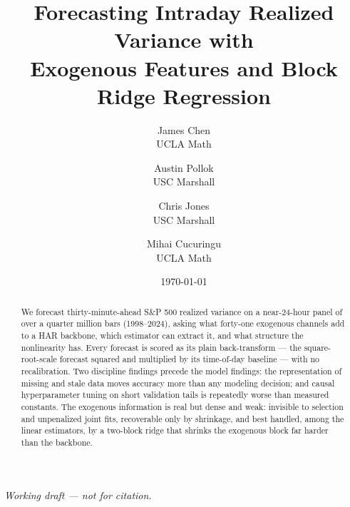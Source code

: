 \documentclass[12pt]{article}
\title{Forecasting Intraday Realized Variance with\\Exogenous Features and Block Ridge Regression}
\author{
James Chen\\{\small UCLA Math}
\and
Austin Pollok\\{\small USC Marshall}
\and
Chris Jones\\{\small USC Marshall}
\and
Mihai Cucuringu\\{\small UCLA Math}
}
\date{\today}
\begin{document}
\maketitle

\begin{center}
\textit{Working draft --- not for citation.}
\end{center}

\begin{abstract}
We forecast thirty-minute-ahead S\&P 500 realized variance on a
near-24-hour panel of over a quarter million bars (1998--2024), asking
what forty-one exogenous channels add to a HAR backbone, which estimator
can extract it, and what structure the nonlinearity has. Every
forecast is scored as its plain back-transform --- the square-root-scale
forecast squared and multiplied by its time-of-day baseline --- with no
recalibration. Two
discipline findings precede the model findings: the representation of
missing and stale data moves accuracy more than any modeling decision;
and causal hyperparameter tuning on short validation tails is repeatedly
worse than measured constants. The exogenous information is real but
dense and weak: invisible to selection and unpenalized joint fits,
recoverable only by shrinkage, and best handled, among the linear
estimators, by a two-block ridge that shrinks the exogenous block far
harder than the backbone.

\end{abstract}
\end{document}
